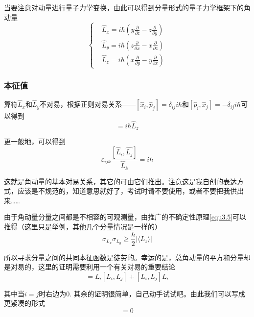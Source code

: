 \documentclass[UTF8]{ctexart}
\begin{document}
\noindent 当要注意对动量进行量子力学变换，由此可以得到分量形式的量子力学框架下的角动量
\begin{equation}
    \left \{ \begin{aligned}
        &\hat{L}_x =i \hbar \left(y \frac{\partial}{\partial z} -z \frac{\partial}{\partial y} \right) \\
        &\hat{L}_y =i \hbar \left(z \frac{\partial}{\partial x} -x \frac{\partial}{\partial z} \right) \\
        &\hat{L}_z =i \hbar \left(x \frac{\partial}{\partial y} -y \frac{\partial}{\partial x} \right) 
    \end{aligned} \right.
\end{equation}

    \subsubsection{本征值}
    算符$\hat{L}_x$和$\hat{L}_y$不对易，根据正则对易关系——$[\hat{x}_i,\hat{p}_j] = \delta_{ij} i \hbar$和$[\hat{p}_i,\hat{x}_j] = - \delta_{ij} i \hbar$可以得到 
    \begin{equation}
        [\hat{L}_x,\hat{L}_y] = i \hbar \hat{L}_z
    \end{equation}

\noindent 更一般地，可以得到
\begin{equation}
    \varepsilon_{ijk} \frac{[\hat{L}_i,\hat{L_j}]}{\hat{L}_k} = i \hbar  
\end{equation}

\noindent 这就是角动量的基本对易关系，其它的可由它们推出。注意这是我自创的表达方式，应该是不规范的，知道意思就好了，考试时请不要使用，或者不要把我供出来……

    由于角动量分量之间都是不相容的可观测量，由推广的不确定性原理\autoref{equ3.5}可以推得（这里只是举例，其他几个分量情况是一样的）
    \begin{equation}
        \sigma_{L_x} \sigma_{L_y} \ge \frac{\hbar}{2} |\langle L_z \rangle |
    \end{equation}

\noindent 所以寻求分量之间的共同本征函数是徒劳的。幸运的是，总角动量的平方和分量却是对易的，这里的证明需要利用一个有关对易的重要结论
\begin{equation}
    [L_i^2,L_j] = L_i[L_i,L_j]+[L_i,L_j] L_i
\end{equation}

\noindent 其中当$i=j$时右边为0. 其余的证明很简单，自己动手试试吧。由此我们可以写成更紧凑的形式
\begin{equation}
    [L^2,\vec{L}] = 0
\end{equation}
\end{document}
